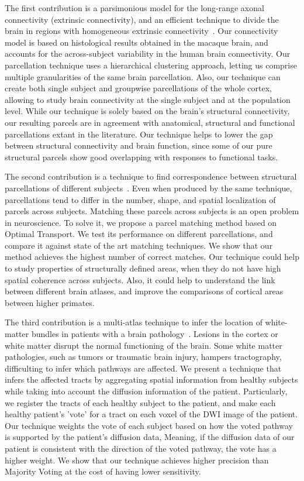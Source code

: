 The first contribution is a parsimonious model for the long-range axonal
connectivity (extrinsic connectivity), and an efficient technique to divide the
brain in regions with homogeneous extrinsic connectivity~\cite{Gallardo2017a}. Our
connectivity model is based on histological results obtained in the macaque
brain, and accounts for the across-subject variability in the human brain
connectivity. Our parcellation technique uses a hierarchical clustering approach,
letting us comprise multiple granularities of the same brain parcellation.
Also, our technique can create both single subject and groupwise parcellations
of the whole cortex, allowing to study brain connectivity at the single subject
and at the population level. While our technique is solely based on the brain's
structural connectivity, our resulting parcels are in agreement with anatomical,
structural and functional parcellations extant in the literature. Our technique
helps to lower the gap between structural connectivity and brain function, since
some of our pure structural parcels show good overlapping with responses to
functional tasks.

The second contribution is a technique to find correspondence between
structural parcellations of different subjects~\cite{Gallardo2018}. Even when
produced by the same technique, parcellations tend to differ in the
number, shape, and spatial localization of parcels across subjects. Matching
these parcels across subjects is an open problem in neuroscience. To solve
it, we propose a parcel matching method based on Optimal Transport. We test its
performance on different parcellations, and compare it against state of the
art matching techniques. We show that our method achieves the highest number
of correct matches. Our technique could help to study properties of structurally
defined areas, when they do not have high spatial coherence across subjects.
Also, it could help to understand the link between different brain atlases, and
improve the comparisons of cortical areas between higher primates.

The third contribution is a multi-atlas technique to infer the location of 
white-matter bundles in patients with a brain pathology~\cite{Guillermo2018}.
Lesions in the cortex or white matter disrupt the normal functioning of the
brain. Some white matter pathologies, such as tumors or traumatic brain injury,
hampers tractography, difficulting to infer which pathways are affected. We 
present a technique that infers the affected tracts by aggregating spatial
information from healthy subjects while taking into account the diffusion
information of the patient. Particularly, we register the tracts of each
healthy subject to the patient, and make each healthy patient's 'vote' for a
tract on each voxel of the DWI image of the patient. Our technique weights the
vote of each subject based on how the voted pathway is supported by the patient's 
diffusion data, Meaning, if the diffusion data of our patient is consistent with
the direction of the voted pathway, the vote has a higher weight. We show that
our technique achieves higher precision than Majority Voting\cite{Xu1992} at
the cost of having lower sensitivity.


